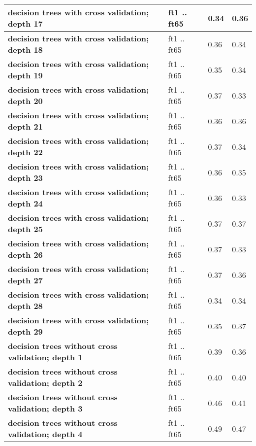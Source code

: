 \begin{tabular}{|l|p{1.2in}|p{0.9in}|p{0.9in}|}
     \hline
      \textbf{ decision trees with cross validation; depth 17 } &  ft1 .. ft65  &  0.34  &  0.36 \\
     \hline
      \textbf{ decision trees with cross validation; depth 18 } &  ft1 .. ft65  &  0.36  &  0.34 \\
     \hline
      \textbf{ decision trees with cross validation; depth 19 } &  ft1 .. ft65  &  0.35  &  0.34 \\
     \hline
      \textbf{ decision trees with cross validation; depth 20 } &  ft1 .. ft65  &  0.37  &  0.33 \\
     \hline
      \textbf{ decision trees with cross validation; depth 21 } &  ft1 .. ft65  &  0.36  &  0.36 \\
     \hline
      \textbf{ decision trees with cross validation; depth 22 } &  ft1 .. ft65  &  0.37  &  0.34 \\
     \hline
      \textbf{ decision trees with cross validation; depth 23 } &  ft1 .. ft65  &  0.36  &  0.35 \\
     \hline
      \textbf{ decision trees with cross validation; depth 24 } &  ft1 .. ft65  &  0.36  &  0.33 \\
     \hline
      \textbf{ decision trees with cross validation; depth 25 } &  ft1 .. ft65  &  0.37  &  0.37 \\
     \hline
      \textbf{ decision trees with cross validation; depth 26 } &  ft1 .. ft65  &  0.37  &  0.33 \\
     \hline
      \textbf{ decision trees with cross validation; depth 27 } &  ft1 .. ft65  &  0.37  &  0.36 \\
     \hline
      \textbf{ decision trees with cross validation; depth 28 } &  ft1 .. ft65  &  0.34  &  0.34 \\
     \hline
      \textbf{ decision trees with cross validation; depth 29 } &  ft1 .. ft65  &  0.35  &  0.37 \\
     \hline
      \textbf{ decision trees without cross validation; depth 1 } &  ft1 .. ft65  &  0.39  &  0.36 \\
     \hline
      \textbf{ decision trees without cross validation; depth 2 } &  ft1 .. ft65  &  0.40  &  0.40 \\
     \hline
      \textbf{ decision trees without cross validation; depth 3 } &  ft1 .. ft65  &  0.46  &  0.41 \\
     \hline
      \textbf{ decision trees without cross validation; depth 4 } &  ft1 .. ft65  &  0.49  &  0.47 \\
     \hline

\end{tabular}
